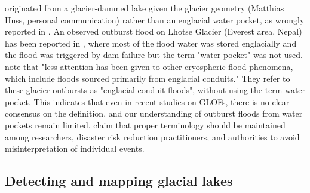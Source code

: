 originated from a glacier-dammed lake given the glacier geometry (Matthias Huss, personal communication) rather than an englacial water pocket, as wrongly reported in \cite{Lutzow&al2023}. An observed outburst flood on Lhotse Glacier (Everest area, Nepal) has been reported in \cite{Rounce&al2017}, where most of the flood water was stored englacially and the flood was triggered by dam failure but the term "water pocket" was not used. \cite{Byers&al2022} note that "less attention has been given to other cryospheric flood phenomena, which include floods sourced primarily from englacial conduits." They refer to these glacier outbursts as "englacial conduit floods", without using the term water pocket. This indicates that even in recent studies on GLOFs, there is no clear consensus on the definition, and our understanding of outburst floods from water pockets remain limited. \cite{Emmer&al2022} claim that proper terminology should be maintained among researchers, disaster risk reduction practitioners, and authorities to avoid misinterpretation of individual events. 


\subsection{Detecting and mapping glacial lakes}
\label{intro_detecting_glacial_lakes}


